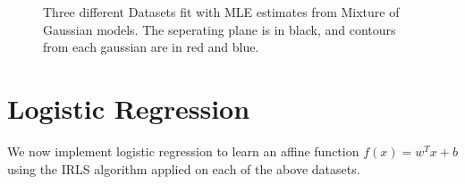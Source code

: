 \documentclass[paper=a4, fontsize=11pt]{scrartcl} %
\numberwithin{equation}{section} %
\numberwithin{figure}{section} %
\numberwithin{table}{section} %
\begin{document}
\begin{figure}
\begin{subfigure}{.5\textwidth}
	\end{subfigure}
	\caption{Three different Datasets fit with MLE estimates from Mixture of Gaussian models. The seperating plane is in black, and contours from each gaussian are in red and blue.}
	\end{figure}
	
\section{Logistic Regression}
	We now implement logistic regression to learn an affine function \(f(x) = w^Tx+b\) using the IRLS algorithm applied on each of the above datasets.
	
	
	
\end{document}
